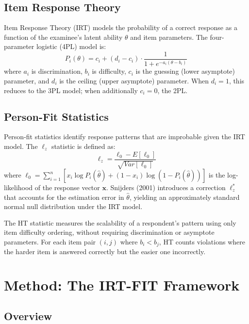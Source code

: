 \documentclass[11pt,a4paper]{article}
\begin{document}
\subsection{Item Response Theory}

Item Response Theory (IRT) models the probability of a correct response as a function of the examinee's latent ability $\theta$ and item parameters. The four-parameter logistic (4PL) model is:
\begin{equation}
P_i(\theta) = c_i + (d_i - c_i) \cdot \frac{1}{1 + e^{-a_i(\theta - b_i)}}
\end{equation}
where $a_i$ is discrimination, $b_i$ is difficulty, $c_i$ is the guessing (lower asymptote) parameter, and $d_i$ is the ceiling (upper asymptote) parameter. When $d_i = 1$, this reduces to the 3PL model; when additionally $c_i = 0$, the 2PL.

\subsection{Person-Fit Statistics}

Person-fit statistics identify response patterns that are improbable given the IRT model. The $\ell_z$ statistic \cite{drasgow1985appropriateness} is defined as:
\begin{equation}
\ell_z = \frac{\ell_0 - E[\ell_0]}{\sqrt{Var[\ell_0]}}
\end{equation}
where $\ell_0 = \sum_{i=1}^n [x_i \log P_i(\hat\theta) + (1-x_i) \log(1-P_i(\hat\theta))]$ is the log-likelihood of the response vector $\mathbf{x}$. Snijders (2001) introduces a correction $\ell_z^*$ that accounts for the estimation error in $\hat\theta$, yielding an approximately standard normal null distribution under the IRT model.

The HT statistic \cite{sijtsma1998methodology} measures the scalability of a respondent's pattern using only item difficulty ordering, without requiring discrimination or asymptote parameters. For each item pair $(i,j)$ where $b_i < b_j$, HT counts violations where the harder item is answered correctly but the easier one incorrectly.

\section{Method: The IRT-FIT Framework}

\subsection{Overview}
\end{document}
